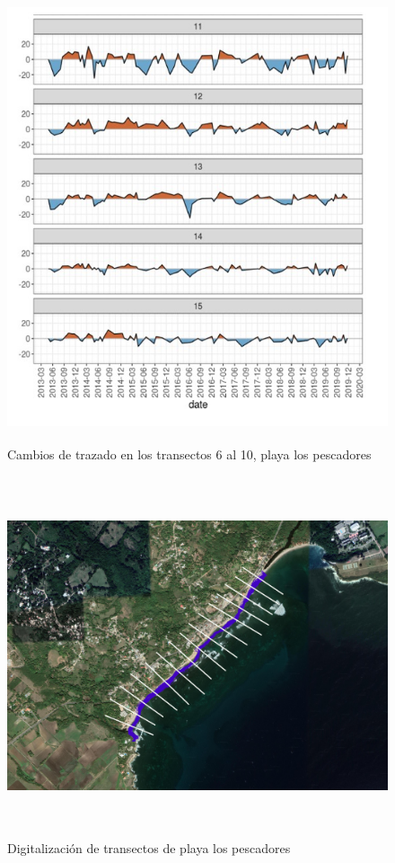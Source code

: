 \documentclass[11pt,]{article}
\begin{document}
\begin{figure}
\centering
\includegraphics[height=5.20833in]{Rcoast_transectos3.jpg}
\caption{Cambios de trazado en los transectos 6 al 10, playa los
pescadores\label{transectosdplaya3}}
\end{figure}

\begin{figure}
\centering
\includegraphics[height=4.16667in]{transectosdplaya.jpg}
\caption{Digitalización de transectos de playa los
pescadores\label{transectosdecambiocosta}}
\end{figure}
\end{document}
